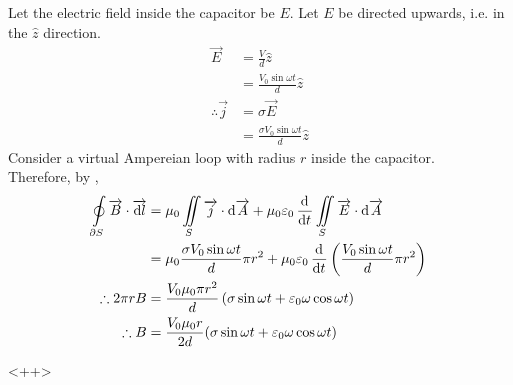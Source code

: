\documentclass[fleqn, a4paper, 12pt, twoside]{article}
\theoremstyle{definition}
\theoremstyle{theorem}
\begin{document}
\begin{solution}
	Let the electric field inside the capacitor be $E$.
	Let $E$ be directed upwards, i.e. in the $\hat{z}$ direction.\\
	\begin{align*}
		\overrightarrow{E}            & = \frac{V}{d} \hat{z}                 \\
                                              & = \frac{V_0 \sin \omega t}{d} \hat{z} \\
		\therefore \overrightarrow{j} & = \sigma \overrightarrow{E}           \\
                                              & = \frac{\sigma V_0 \sin \omega t}{d} \hat{z}
	\end{align*}
	Consider a virtual Ampereian loop with radius $r$ inside the capacitor.\\
	Therefore, by ,
	\begin{align*}
		\oint\limits_{\partial S} \overrightarrow{B} \cdot \overrightarrow{\dif l} & = \mu_0 \iint\limits_{S} \overrightarrow{j} \cdot \dif \overrightarrow{A} + \mu_0 \varepsilon_0 \dod{}{t}\iint\limits_{S} \overrightarrow{E} \cdot \dif \overrightarrow{A} \\
                                                                                           & = \mu_0 \frac{\sigma V_0 \sin \omega t}{d} \pi r^2 + \mu_0 \varepsilon_0 \dod{}{t}\left( \frac{V_0 \sin \omega t}{d} \pi r^2 \right)                                       \\
		\therefore 2 \pi r B                                                       & = \frac{V_0 \mu_0 \pi r^2}{d} \left( \sigma \sin \omega t + \varepsilon_0 \omega \cos \omega t \right)                                                                     \\
		\therefore B                                                               & = \frac{V_0 \mu_0 r}{2 d} (\sigma \sin \omega t + \varepsilon_0 \omega \cos \omega t)
	\end{align*}
\end{solution}<++>
\end{document}

